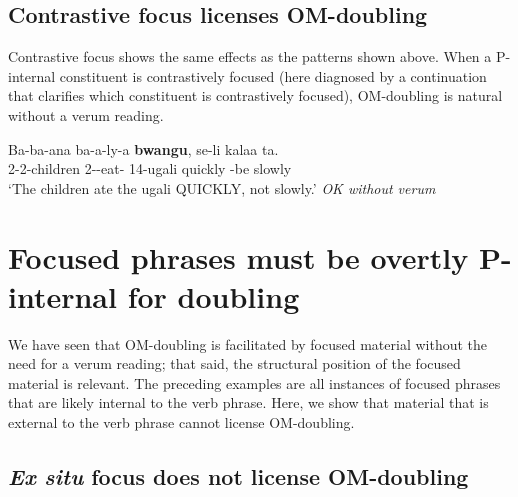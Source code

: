\documentclass[output=paper]{langscibook}
\begin{document}

\subsection{Contrastive focus licenses OM-doubling}

Contrastive focus shows the same effects as the patterns shown above. When a {\lilv}P-internal constituent is contrastively focused (here diagnosed by a continuation that clarifies which constituent is contrastively focused), OM-doubling is natural without a verum reading. 

\ea \label{ContrastiveFocusManner}
\gll Ba-ba-ana ba-a-ly-a  \textbf{bwangu}, se-li kalaa ta. \\
2-2-children 2\Sm-\Om-eat-\Fv{} 14-ugali quickly \Neg-be slowly \Neg \\
\glt `The children ate the ugali QUICKLY, not slowly.’ \textit{OK without verum}
\z 

\section{Focused phrases must be overtly {\lilv}P-internal for doubling} \label{SectVpInternal}

We have seen that OM-doubling is facilitated by focused material without the need for a verum reading; that said, the structural position of the focused material is relevant. The preceding examples are all instances of focused phrases that are likely internal to the verb phrase. Here, we show that material that is external to the verb phrase cannot license OM-doubling.

\subsection{\textit{Ex situ} focus does not license OM-doubling}


\end{document}
